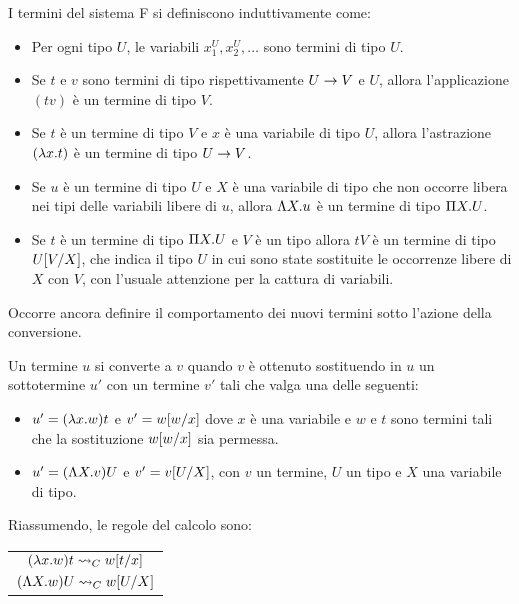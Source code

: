 \documentclass[]{marticle}
\begin{document}
\begin{block}[Definizione]
    I termini del sistema F si definiscono induttivamente come:
    \begin{itemize}
        \item Per ogni tipo $U$, le variabili $x^U_1, x^U_2, \dots$ sono termini
            di tipo $U$.
        \item Se $t$ e $v$ sono termini di tipo rispettivamente $U\rar V$ e $U$,
            allora l'applicazione $(tv)$ \`e un termine di tipo $V$.
        \item Se $t$ \`e un termine di tipo $V$ e $x$ \`e una variabile di tipo
            $U$, allora l'astrazione $(\l x.  t)$ \`e un termine di tipo $U\rar
            V$.
        \item Se $u$ \`e un termine di tipo $U$ e $X$ \`e una variabile di tipo
            che non occorre libera nei tipi delle variabili libere di $u$,
            allora $\L X. u$ \`e un termine di tipo $\P X.U$. 
        \item Se $t$ \`e un termine di tipo $\P X. U$ e $V$ \`e un tipo allora
            $tV$ \`e un termine di tipo $U\sub{V}{X}$, che indica il tipo $U$
            in cui sono state sostituite le occorrenze libere di $X$ con $V$,
            con l'usuale attenzione per la cattura di variabili.
    \end{itemize}
\end{block}

Occorre ancora definire il comportamento dei nuovi termini sotto l'azione della
conversione.
\begin{block}[Definizione]
    Un termine $u$ si converte a $v$ quando $v$ \`e ottenuto sostituendo in $u$
    un sottotermine $u'$ con un termine $v'$ tali che valga una delle seguenti:
    \begin{itemize}
        \item $u'= (\l x. w)t$ e $v' = w\sub{w}{x}$ dove $x$ \`e una variabile e
            $w$ e $t$ sono termini tali che la sostituzione $w\sub{w}{x}$ sia
            permessa.
        \item $u' = (\L X.v)U$ e $v'=v\sub{U}{X}$, con $v$ un termine, $U$ un
            tipo e $X$ una variabile di tipo.
    \end{itemize}
    Riassumendo, le regole del calcolo sono:
\begin{center}
{\renewcommand{\arraystretch}{1.3} 
\begin{tabular}{|c|}
    \hline
    $(\l x. w) t \conv_C w\sub{t}{x}$ \\
    $(\L X. w) U \conv_C w\sub{U}{X}$ \\
    \hline
\end{tabular}
}
\end{center}
\end{block}
\end{document}
